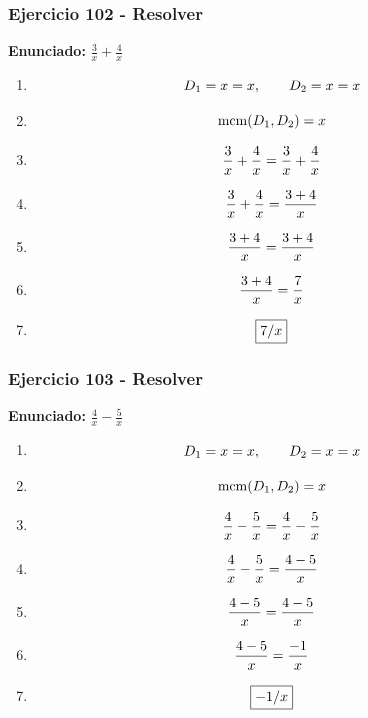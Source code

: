 \documentclass[11pt,a4paper]{article}
\newcommand{\fitmath}[1]{%
\[
\setbox0=\hbox{$\displaystyle #1$}%
\ifdim\wd0>\linewidth
\resizebox{\linewidth}{!}{$\displaystyle #1$}%
\else
#1%
\fi
\]
}
\begin{document}
\vspace{0.12cm}
\subsubsection*{Ejercicio 102 - Resolver}
\textbf{Enunciado:} $ \frac{3}{x} + \frac{4}{x} $\par
\begin{enumerate}[leftmargin=2em]
\item \fitmath{D_1=x=x,\qquad D_2=x=x}
\item \fitmath{\operatorname{mcm}(D_1,D_2)=x}
\item \fitmath{\frac{3}{x} + \frac{4}{x}= \frac{3}{x} + \frac{4}{x}}
\item \fitmath{\frac{3}{x} + \frac{4}{x}=\frac{3 + 4}{x}}
\item \fitmath{\frac{3 + 4}{x}=\frac{3 + 4}{x}}
\item \fitmath{\frac{3 + 4}{x}=\frac{7}{x}}
\item \fitmath{\boxed{7 / x}}
\end{enumerate}

\vspace{0.12cm}
\subsubsection*{Ejercicio 103 - Resolver}
\textbf{Enunciado:} $ \frac{4}{x} - \frac{5}{x} $\par
\begin{enumerate}[leftmargin=2em]
\item \fitmath{D_1=x=x,\qquad D_2=x=x}
\item \fitmath{\operatorname{mcm}(D_1,D_2)=x}
\item \fitmath{\frac{4}{x} - \frac{5}{x}= \frac{4}{x} - \frac{5}{x}}
\item \fitmath{\frac{4}{x} - \frac{5}{x}=\frac{4 - 5}{x}}
\item \fitmath{\frac{4 - 5}{x}=\frac{4 - 5}{x}}
\item \fitmath{\frac{4 - 5}{x}=\frac{-1}{x}}
\item \fitmath{\boxed{- 1 / x}}
\end{enumerate}

\vspace{0.12cm}
\end{document}
